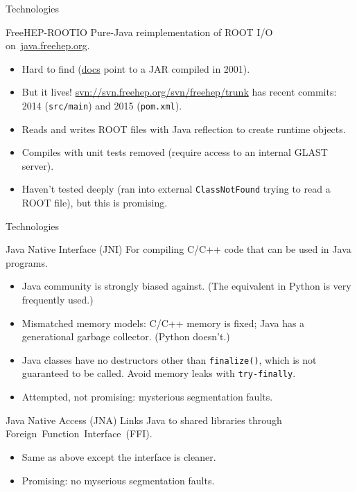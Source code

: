 \documentclass{beamer}
\begin{document}
\begin{frame}{Technologies}

\begin{block}{FreeHEP-ROOTIO}
Pure-Java reimplementation of ROOT I/O \mbox{on \url{java.freehep.org}.\hspace{-1 cm}}
\begin{itemize}
\item Hard to find (\href{http://java.freehep.org/freehep-rootio/}{docs} point to a JAR compiled in 2001).
\item But it lives! \url{svn://svn.freehep.org/svn/freehep/trunk} has recent commits: 2014 ({\tt src/main}) and 2015 ({\tt pom.xml}).
\item Reads and writes ROOT files with Java reflection to create runtime objects.
\item Compiles with unit tests removed (require access to an internal GLAST server).
\item Haven't tested deeply (ran into external {\tt ClassNotFound} trying to read a ROOT file), but this is promising.
\end{itemize}
\end{block}
\end{frame}

\begin{frame}{Technologies}
\begin{block}{Java Native Interface (JNI)}
For compiling C/C++ code that can be used in Java programs.
\begin{itemize}
\item Java community is strongly biased against. (The equivalent in Python is very frequently used.)
\item Mismatched memory models: C/C++ memory is fixed; Java has a generational garbage collector. (Python doesn't.)
\item Java classes have no destructors other than {\tt finalize()}, which is not guaranteed to be called. Avoid memory leaks with {\tt try-finally}.
\item Attempted, not promising: mysterious segmentation faults.
\end{itemize}
\end{block}

\begin{block}{Java Native Access (JNA)}
Links Java to shared libraries through \mbox{Foreign Function Interface (FFI).\hspace{-1 cm}}
\begin{itemize}
\item Same as above except the interface is cleaner.
\item Promising: no myserious segmentation faults.
\end{itemize}
\end{block}
\end{frame}
\end{document}
